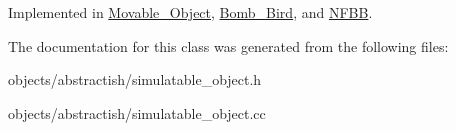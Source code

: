 Implemented in \hyperlink{classMovable__Object_ac267e0c945b558b0cf533d7fbe5ee7c3}{Movable\+\_\+\+Object}, \hyperlink{classBomb__Bird_a610b4c68c560a6ac30375c177642e021}{Bomb\+\_\+\+Bird}, and \hyperlink{classNFBB_a42a134a62a5d4049b74e7b4f4d7402dc}{N\+F\+B\+B}.



The documentation for this class was generated from the following files\+:\begin{DoxyCompactItemize}
\item 
objects/abstractish/simulatable\+\_\+object.\+h\item 
objects/abstractish/simulatable\+\_\+object.\+cc\end{DoxyCompactItemize}
